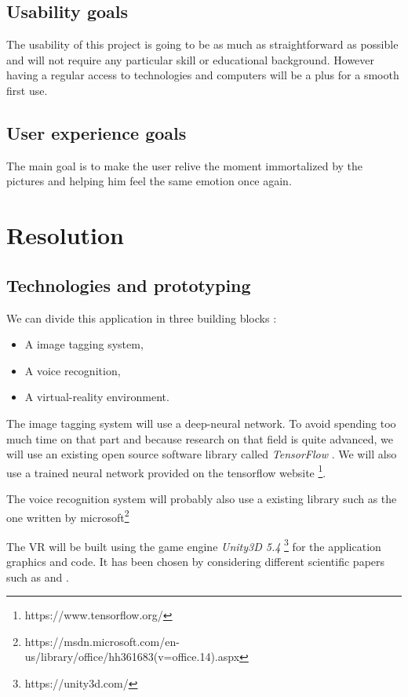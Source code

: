 \documentclass[11pt,a4paper]{article}
\begin{document}
\subsection{Usability goals}

The usability of this project is going to be as much as straightforward as possible and will not require any particular skill or educational background. However having a regular access to technologies and computers will be a plus for a smooth first use. 

\subsection{User experience goals}

The main goal is to make the user relive the moment immortalized by the pictures and helping him feel the same emotion once again.

\section{Resolution}

\subsection{Technologies and prototyping}

We can divide this application in three building blocks :
\begin{itemize}
	\item A image tagging system,
	\item A voice recognition,
	\item A virtual-reality environment.
\end{itemize}

The image tagging system will use a deep-neural network. To avoid spending too much time on that part and because research on that field is quite advanced, we will use an existing open source software library called \textit{TensorFlow} \cite{abadi2016tensorflow}. We will also use a trained neural network provided on the tensorflow website \footnote{https://www.tensorflow.org/}.

The voice recognition system will probably also use a existing library such as the one written by microsoft\footnote{https://msdn.microsoft.com/en-us/library/office/hh361683(v=office.14).aspx}

The VR will be built using the game engine \textit{Unity3D 5.4} \footnote{https://unity3d.com/} for the application graphics and code. It has been chosen by considering different scientific papers such as \cite{Mazuryk1996} and \cite{calado2013virtual}.
\end{document}
